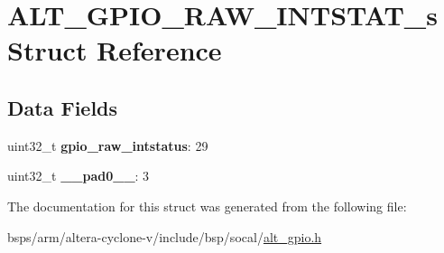 \hypertarget{structALT__GPIO__RAW__INTSTAT__s}{}\section{A\+L\+T\+\_\+\+G\+P\+I\+O\+\_\+\+R\+A\+W\+\_\+\+I\+N\+T\+S\+T\+A\+T\+\_\+s Struct Reference}
\label{structALT__GPIO__RAW__INTSTAT__s}
\subsection*{Data Fields}
\begin{DoxyCompactItemize}
\item 
\mbox{\label{structALT__GPIO__RAW__INTSTAT__s_a8c858cb4987d44107fe32b7cb295f4d3}} 
uint32\+\_\+t {\bfseries gpio\+\_\+raw\+\_\+intstatus}\+: 29
\item 
\mbox{\label{structALT__GPIO__RAW__INTSTAT__s_a56b974de01ac68e8dfc1481d183170d4}} 
uint32\+\_\+t {\bfseries \+\_\+\+\_\+pad0\+\_\+\+\_\+}\+: 3
\end{DoxyCompactItemize}


The documentation for this struct was generated from the following file\+:\begin{DoxyCompactItemize}
\item 
bsps/arm/altera-\/cyclone-\/v/include/bsp/socal/\mbox{\hyperlink{alt__gpio_8h}{alt\+\_\+gpio.\+h}}\end{DoxyCompactItemize}
